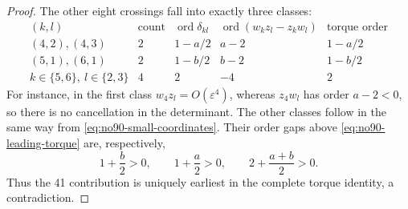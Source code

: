 \documentclass[11pt]{amsart}
\theoremstyle{remark}
\newcommand{\ord}{\operatorname{ord}}
\begin{document}
\begin{proof}
The other eight crossings fall into exactly three classes:
\[
\begin{array}{c|c|c|c|c}
(k,l)&\text{count}&\ord\delta_{kl}&
\ord(w_kz_l-z_kw_l)&\text{torque order}\\\hline
(4,2),(4,3)&2&1-a/2&a-2&1-a/2\\
(5,1),(6,1)&2&1-b/2&b-2&1-b/2\\
k\in\{5,6\},\ l\in\{2,3\}&4&2&-4&2
\end{array}
\]
For instance, in the first class $w_4z_l=O(\varepsilon^4)$, whereas $z_4w_l$ has order $a-2<0$, so there is no cancellation in the determinant. The other classes follow in the same way from \eqref{eq:no90-small-coordinates}. Their order gaps above \eqref{eq:no90-leading-torque} are, respectively,
\[
1+\frac b2>0,\qquad 1+\frac a2>0,
\qquad 2+\frac{a+b}{2}>0.
\]
Thus the 41 contribution is uniquely earliest in the complete torque identity, a contradiction.
\end{proof}
\end{document}
